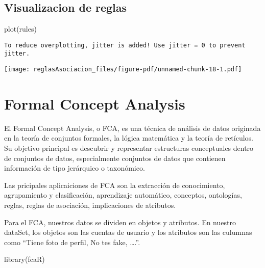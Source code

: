 \documentclass[
  letterpaper,
  DIV=11,
  numbers=noendperiod]{scrreprt}
\newenvironment{Shaded}{\begin{snugshade}}{\end{snugshade}}
\newcommand{\FunctionTok}[1]{\textcolor[rgb]{0.28,0.35,0.67}{#1}}
\newcommand{\NormalTok}[1]{\textcolor[rgb]{0.00,0.23,0.31}{#1}}
\begin{document}
\section{}\label{section}

\section{Visualizacion de reglas}\label{visualizacion-de-reglas}

\begin{Shaded}
\begin{Highlighting}[]
\FunctionTok{plot}\NormalTok{(rules)}
\end{Highlighting}
\end{Shaded}

\begin{verbatim}
To reduce overplotting, jitter is added! Use jitter = 0 to prevent jitter.
\end{verbatim}

\texttt{[image: reglasAsociacion\_files/figure-pdf/unnamed-chunk-18-1.pdf]}


\chapter{Formal Concept Analysis}\label{formal-concept-analysis}

El Formal Concept Analysis, o FCA, es una técnica de análisis de datos
originada en la teoría de conjuntos formales, la lógica matemática y la
teoría de retículos. Su objetivo principal es descubrir y representar
estructuras conceptuales dentro de conjuntos de datos, especialmente
conjuntos de datos que contienen información de tipo jerárquico o
taxonómico.

Las pricipales aplicaiciones de FCA son la extracción de conocimiento,
agrupamiento y clasificación, aprendizaje automático, conceptos,
ontologías, reglas, reglas de asociación, implicaciones de atributos.

Para el FCA, nuestros datos se dividen en objetos y atributos. En
nuestro dataSet, los objetos son las cuentas de usuario y los atributos
son las culumnas como ``Tiene foto de perfil, No tes fake, \ldots.''.

\begin{Shaded}
\begin{Highlighting}[]
\FunctionTok{library}\NormalTok{(fcaR)}
\end{Highlighting}
\end{Shaded}
\end{document}
